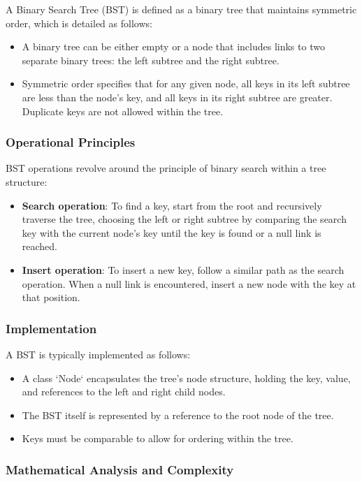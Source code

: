 \documentclass{article}
\begin{document}
A Binary Search Tree (BST) is defined as a binary tree that maintains symmetric order, which is detailed as follows:

\begin{itemize}
    \item A binary tree can be either empty or a node that includes links to two separate binary trees: the left subtree and the right subtree.
    \item Symmetric order specifies that for any given node, all keys in its left subtree are less than the node's key, and all keys in its right subtree are greater. Duplicate keys are not allowed within the tree.
\end{itemize}

\subsubsection{Operational Principles}
BST operations revolve around the principle of binary search within a tree structure:

\begin{itemize}
    \item \textbf{Search operation}: To find a key, start from the root and recursively traverse the tree, choosing the left or right subtree by comparing the search key with the current node's key until the key is found or a null link is reached.
    \item \textbf{Insert operation}: To insert a new key, follow a similar path as the search operation. When a null link is encountered, insert a new node with the key at that position.
\end{itemize}

\subsubsection{Implementation}
A BST is typically implemented as follows:
\begin{itemize}
    \item A class `Node` encapsulates the tree's node structure, holding the key, value, and references to the left and right child nodes.
    \item The BST itself is represented by a reference to the root node of the tree.
    \item Keys must be comparable to allow for ordering within the tree.
\end{itemize}

\subsubsection{Mathematical Analysis and Complexity}
\end{document}
